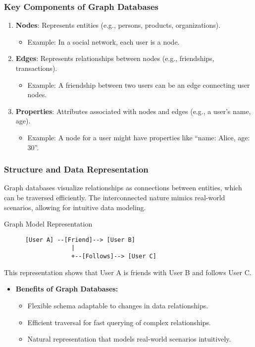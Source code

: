 \documentclass[aspectratio=169]{beamer}
\begin{document}
\begin{frame}[fragile]
    \frametitle{Key Components of Graph Databases}
    \begin{enumerate}
        \item \textbf{Nodes}: Represents entities (e.g., persons, products, organizations).
        \begin{itemize}
            \item Example: In a social network, each user is a node.
        \end{itemize}
        
        \item \textbf{Edges}: Represents relationships between nodes (e.g., friendships, transactions).
        \begin{itemize}
            \item Example: A friendship between two users can be an edge connecting user nodes.
        \end{itemize}
        
        \item \textbf{Properties}: Attributes associated with nodes and edges (e.g., a user's name, age).
        \begin{itemize}
            \item Example: A node for a user might have properties like ``name: Alice, age: 30''.
        \end{itemize}
    \end{enumerate}
\end{frame}

\begin{frame}[fragile]
    \frametitle{Structure and Data Representation}
    Graph databases visualize relationships as connections between entities, which can be traversed efficiently. 
    The interconnected nature mimics real-world scenarios, allowing for intuitive data modeling.
    
    \begin{block}{Graph Model Representation}
      \begin{verbatim}
      [User A] --[Friend]--> [User B]
                   |   
                   +--[Follows]--> [User C]
      \end{verbatim}
      \end{block}
    
    This representation shows that User A is friends with User B and follows User C.
    
    \begin{itemize}
        \item \textbf{Benefits of Graph Databases:}
        \begin{itemize}
            \item Flexible schema adaptable to changes in data relationships.
            \item Efficient traversal for fast querying of complex relationships.
            \item Natural representation that models real-world scenarios intuitively.
        \end{itemize}
    \end{itemize}
\end{frame}
\end{document}
